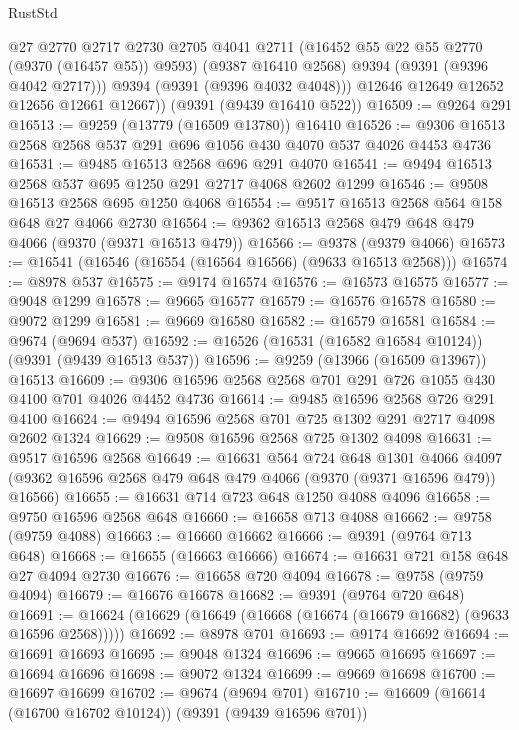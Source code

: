 \begin{lexlean}{RustStd}
\begin{coremodule}
            @27
            @2770
            @2717
            @2730
            @2705
            @4041
            @2711
            (@16452 @55 @22 @55 @2770 (@9370 (@16457 @55)) @9593)
            (@9387 @16410 @2568)
            @9394
            (@9391 (@9396 @4042 @2717)))
          @9394
          (@9391 (@9396 @4032 @4048)))
        @12646
        @12649
        @12652
        @12656
        @12661
        @12667))
    (@9391 (@9439 @16410 @522))
@16509 := @9264 @291
@16513 := @9259 (@13779 (@16509 @13780)) @16410
@16526 := @9306 @16513 @2568 @2568 @537 @291 @696 @1056 @430 @4070 @537 @4026 @4453 @4736
@16531 := @9485 @16513 @2568 @696 @291 @4070
@16541 := @9494 @16513 @2568 @537 @695 @1250 @291 @2717 @4068 @2602 @1299
@16546 := @9508 @16513 @2568 @695 @1250 @4068
@16554 := @9517 @16513 @2568 @564 @158 @648 @27 @4066 @2730
@16564 := @9362 @16513 @2568 @479 @648 @479 @4066 (@9370 (@9371 @16513 @479))
@16566 := @9378 (@9379 @4066)
@16573 := @16541 (@16546 (@16554 (@16564 @16566) (@9633 @16513 @2568)))
@16574 := @8978 @537
@16575 := @9174 @16574
@16576 := @16573 @16575
@16577 := @9048 @1299
@16578 := @9665 @16577
@16579 := @16576 @16578
@16580 := @9072 @1299
@16581 := @9669 @16580
@16582 := @16579 @16581
@16584 := @9674 (@9694 @537)
@16592 := @16526 (@16531 (@16582 @16584 @10124)) (@9391 (@9439 @16513 @537))
@16596 := @9259 (@13966 (@16509 @13967)) @16513
@16609 := @9306 @16596 @2568 @2568 @701 @291 @726 @1055 @430 @4100 @701 @4026 @4452 @4736
@16614 := @9485 @16596 @2568 @726 @291 @4100
@16624 := @9494 @16596 @2568 @701 @725 @1302 @291 @2717 @4098 @2602 @1324
@16629 := @9508 @16596 @2568 @725 @1302 @4098
@16631 := @9517 @16596 @2568
@16649 := @16631
    @564
    @724
    @648
    @1301
    @4066
    @4097
    (@9362 @16596 @2568 @479 @648 @479 @4066 (@9370 (@9371 @16596 @479)) @16566)
@16655 := @16631 @714 @723 @648 @1250 @4088 @4096
@16658 := @9750 @16596 @2568 @648
@16660 := @16658 @713 @4088
@16662 := @9758 (@9759 @4088)
@16663 := @16660 @16662
@16666 := @9391 (@9764 @713 @648)
@16668 := @16655 (@16663 @16666)
@16674 := @16631 @721 @158 @648 @27 @4094 @2730
@16676 := @16658 @720 @4094
@16678 := @9758 (@9759 @4094)
@16679 := @16676 @16678
@16682 := @9391 (@9764 @720 @648)
@16691 := @16624 (@16629 (@16649 (@16668 (@16674 (@16679 @16682) (@9633 @16596 @2568)))))
@16692 := @8978 @701
@16693 := @9174 @16692
@16694 := @16691 @16693
@16695 := @9048 @1324
@16696 := @9665 @16695
@16697 := @16694 @16696
@16698 := @9072 @1324
@16699 := @9669 @16698
@16700 := @16697 @16699
@16702 := @9674 (@9694 @701)
@16710 := @16609 (@16614 (@16700 @16702 @10124)) (@9391 (@9439 @16596 @701))

\end{coremodule}
\end{lexlean}
